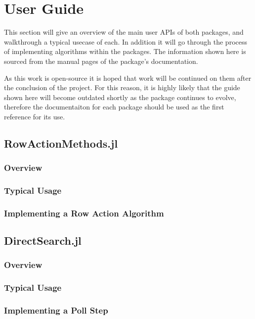 \section{User Guide}\label{section_guide}
This section will give an overview of the main user APIs of both packages, and walkthrough a typical usecase of each. In addition it will go through the process of implementing algorithms within the packages. The information shown here is sourced from the manual pages of the package's documentation. 

As this work is open-source it is hoped that work will be continued on them after the conclusion of the project. For this reason, it is highly likely that the guide shown here will become outdated shortly as the package continues to evolve, therefore the documentaiton for each package should be used as the first reference for its use.

\subsection{RowActionMethods.jl}
\subsubsection{Overview}
\subsubsection{Typical Usage}
\subsubsection{Implementing a Row Action Algorithm}

\subsection{DirectSearch.jl}
\subsubsection{Overview}
\subsubsection{Typical Usage}
\subsubsection{Implementing a Poll Step}
